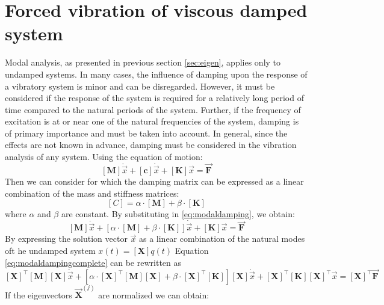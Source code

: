 \section{Forced vibration of viscous damped system}\label{sec:viscoussystem}
Modal analysis, as presented in previous section \ref{sec:eigen}, applies only
to undamped systems.
In many cases, the influence of damping upon the response of a vibratory system
is minor and can be disregarded. However, it must be considered if the response
of the system is required for a relatively long period of time compared to the
natural periods of the system. Further, if the frequency of excitation is at or
near one of the natural frequencies of the system, damping is of primary
importance and must be taken into account. In general, since the effects are not
known in advance, damping must be considered in the vibration analysis of any
system.
Using the equation of motion:
\begin{equation}\label{eq:modaldamping}
  [\mathbf{M}] \ddot{\vec{x}} + [\mathbf{c}] \dot{\vec{x}} +[\mathbf{K}] \vec{x}
   = \vec{\mathbf{F}}
\end{equation}
%
Then we can consider for which the damping matrix can be expressed as a linear
combination of the mass and stiffness matrices:
\begin{equation}
\label{eq:moadlpropdamping}
	[C] = \alpha \cdot [\mathbf{M}] + \beta \cdot [\mathbf{K}]
\end{equation}
where \(\alpha\) and \(\beta\) are constant. By substituting in
\eqref{eq:modaldamping}, we obtain:
\begin{equation}\label{eq:modaldampingcomplete}
	[\mathbf{M}] \ddot{\vec{x}} +
	[\alpha \cdot [\mathbf{M}] + \beta \cdot [\mathbf{K}]] \dot{\vec{x}} +
	[\mathbf{K}] \vec{x}= \vec{\mathbf{F}}
\end{equation}
By expressing the solution vector \(\vec{x}\) as a linear combination of the
natural modes oft he undamped system \(x(t) = [\mathbf{X}]q(t)\)
Equation \eqref{eq:modaldampingcomplete} can be rewritten as
\begin{equation}\label{eq:modaldampingexpansed}
	[\mathbf{X}]^{\top}[\mathbf{M}][\mathbf{X}] \ddot{\vec{x}} +
	[\alpha \cdot [\mathbf{X}]^{\top}[\mathbf{M}][\mathbf{X}] +
   \beta \cdot [\mathbf{X}]^{\top}[\mathbf{K}]][\mathbf{X}] \dot{\vec{x}} +
	[\mathbf{X}]^{\top}[\mathbf{K}][\mathbf{X}]^{\top} \vec{x} =
  [\mathbf{X}]^{\top}\vec{\mathbf{F}}
\end{equation}
%
If the eigenvectors \(\vec{\mathbf{X}}^{(j)}\) are normalized we can obtain:
